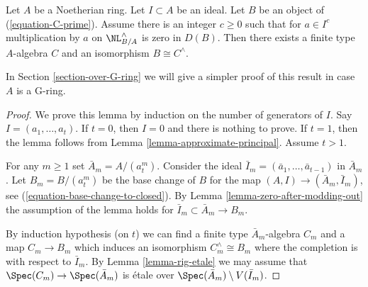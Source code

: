 \begin{lemma}
\label{lemma-approximate}
Let $A$ be a Noetherian ring. Let $I \subset A$ be an ideal.
Let $B$ be an object of (\ref{equation-C-prime}).
Assume there is an integer $c \geq 0$ such that for $a \in I^c$
multiplication by $a$ on $\NL_{B/A}^\wedge$ is zero in $D(B)$.
Then there exists a finite type $A$-algebra $C$ and an
isomorphism $B \cong C^\wedge$.
\end{lemma}

\noindent
In Section \ref{section-over-G-ring} we will give a simpler
proof of this result in case $A$ is a G-ring.

\begin{proof}
We prove this lemma by induction on the number of generators of $I$.
Say $I = (a_1, \ldots, a_t)$. If $t = 0$, then $I = 0$ and there
is nothing to prove. If $t = 1$, then the lemma follows from
Lemma \ref{lemma-approximate-principal}. Assume $t > 1$.

\medskip\noindent
For any $m \geq 1$ set $\bar A_m = A/(a_t^m)$. Consider the ideal
$\bar I_m = (\bar a_1, \ldots, \bar a_{t - 1})$ in $\bar A_m$.
Let $B_m = B/(a_t^m)$ be the base change of $B$ for the
map $(A, I) \to (\bar A_m, \bar I_m)$, see
(\ref{equation-base-change-to-closed}).
By Lemma \ref{lemma-zero-after-modding-out}
the assumption of the lemma holds for
$\bar I_m \subset \bar A_m \to B_m$.

\medskip\noindent
By induction hypothesis (on $t$) we can find a finite type
$\bar A_m$-algebra $C_m$ and a map $C_m \to B_m$ which induces an
isomorphism $C_m^\wedge \cong B_m$
where the completion is with respect to $\bar I_m$.
By Lemma \ref{lemma-rig-etale} we may assume that
$\Spec(C_m) \to \Spec(\bar A_m)$ is \'etale
over $\Spec(\bar A_m) \setminus V(\bar I_m)$.


\end{proof}
